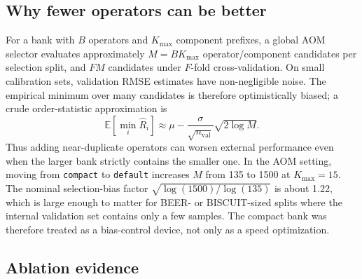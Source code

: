 \documentclass[11pt,a4paper]{article}
\newcommand{\code}[1]{\nolinkurl{#1}}
\begin{document}
\subsection{Why fewer operators can be better}

For a bank with $B$ operators and $K_{\max}$ component prefixes, a global
AOM selector evaluates approximately $M=B K_{\max}$ operator/component
candidates per selection split, and $F M$ candidates under $F$-fold
cross-validation.  On small calibration sets, validation RMSE estimates have
non-negligible noise.  The empirical minimum over many candidates is therefore
optimistically biased; a crude order-statistic approximation is
\begin{equation}
  \mathbb E[\min_i \widehat R_i]
  \approx
  \mu - \frac{\sigma}{\sqrt{n_{\mathrm{val}}}}\sqrt{2\log M}.
\end{equation}
Thus adding near-duplicate operators can worsen external performance even
when the larger bank strictly contains the smaller one.  In the AOM setting,
moving from \code{compact} to \code{default} increases $M$ from 135 to 1500
at $K_{\max}=15$.  The nominal selection-bias factor
$\sqrt{\log(1500)/\log(135)}$ is about 1.22, which is large enough to matter
for BEER- or BISCUIT-sized splits where the internal validation set contains
only a few samples.  The compact bank was therefore treated as a bias-control
device, not only as a speed optimization.

\subsection{Ablation evidence}
\end{document}
